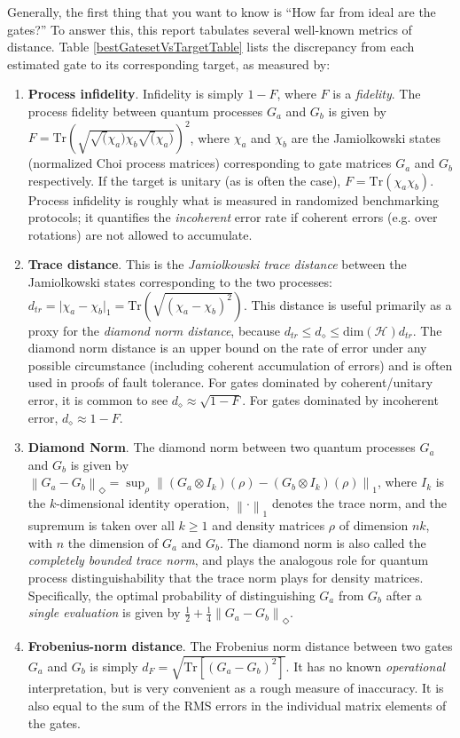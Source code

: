\documentclass{article}[11pt]
\newcommand{\norm}[1]{\left\lVert#1\right\rVert}
\newcommand{\Tr}[0]{\mathrm{Tr}}
\begin{document}
Generally, the first thing that you want to know is ``How far from ideal are the gates?''  To answer this, this report tabulates several well-known metrics of distance.  Table \ref{bestGatesetVsTargetTable} lists the discrepancy from each estimated gate to its corresponding target, as measured by:
\begin{enumerate}
\item \textbf{Process infidelity}.  Infidelity is simply $1-F$, where $F$ is a \emph{fidelity}.  The process fidelity between quantum processes $G_a$ and $G_b$ is given by $F = \Tr\left( \sqrt{ \sqrt(\chi_a) \chi_b \sqrt(\chi_a) } \right)^2$, where $\chi_a$ and $\chi_b$ are the Jamiolkowski states (normalized Choi process matrices) corresponding to gate matrices $G_a$ and $G_b$ respectively.  If the target is unitary (as is often the case), $F = \Tr\left( \chi_a \chi_b \right)$.  Process infidelity is roughly what is measured in randomized benchmarking protocols; it quantifies the \emph{incoherent} error rate if coherent errors (e.g. over rotations) are not allowed to accumulate.
\item \textbf{Trace distance}.  This is the \emph{Jamiolkowski trace distance} between the Jamiolkowski states corresponding to the two processes:  $d_{tr} = \vert\chi_a - \chi_b\vert_1 = \Tr\left(\sqrt{(\chi_a-\chi_b)^2}\right)$.  This distance is useful primarily as a proxy for the \emph{diamond norm distance}, because $d_{tr} \leq d_{\diamond} \leq \mathrm{dim}(\mathcal{H}) d_{tr}$.  The diamond norm distance is an upper bound on the rate of error under any possible circumstance (including coherent accumulation of errors) and is often used in proofs of fault tolerance.  For gates dominated by coherent/unitary error, it is common to see $d_{\diamond} \approx \sqrt{1-F}$.  For gates dominated by incoherent error, $d_{\diamond} \approx 1-F$.
\item \textbf{Diamond Norm}.  The diamond norm between two quantum processes $G_a$ and $G_b$ is given by $\norm{G_a - G_b}_\Diamond = \sup_\rho \norm{(G_a \otimes I_k)(\rho) - (G_b \otimes I_k)(\rho)}_1$, where $I_k$ is the $k$-dimensional identity operation, $\norm{\cdot}_1$ denotes the trace norm, and the supremum is taken over all $k \ge 1$ and density matrices $\rho$ of dimension $nk$, with $n$ the dimension of $G_a$ and $G_b$.  The diamond norm is also called the \emph{completely bounded trace norm}, and plays the analogous role for quantum process distinguishability that the trace norm plays for density matrices.  Specifically, the optimal probability of distinguishing $G_a$ from $G_b$ after a \emph{single evaluation} is given by $\frac{1}{2} + \frac{1}{4}\norm{G_a - G_b}_\Diamond$.
\item \textbf{Frobenius-norm distance}.  The Frobenius norm distance between two gates $G_a$ and $G_b$ is simply $d_F = \sqrt{\Tr\left[\left(G_a-G_b\right)^2\right]}$.  It has no known \emph{operational} interpretation, but is very convenient as a rough measure of inaccuracy.  It is also equal to the sum of the RMS errors in the individual matrix elements of the gates.
\end{enumerate}
\end{document}
